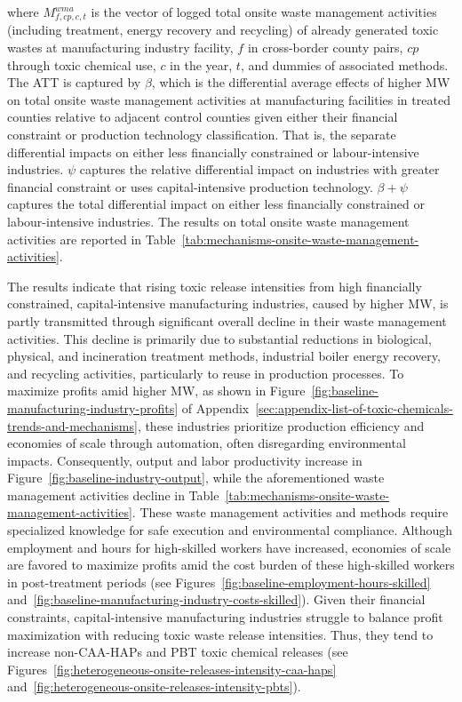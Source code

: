 \documentclass[12pt, english]{article}
\begin{document}
    where $M_{f,cp,c,t}^{wma}$ is the vector of logged total onsite waste management activities (including treatment, energy recovery and recycling) of already generated toxic wastes at manufacturing industry facility, $f$ in cross-border county pairs, $cp$ through toxic chemical use, $c$ in the year, $t$, and dummies of associated methods. The ATT is captured by $\beta$, which is the differential average effects of higher MW on total onsite waste management activities at manufacturing facilities in treated counties relative to adjacent control counties given either their financial constraint or production technology classification. That is, the separate differential impacts on either less financially constrained or labour-intensive industries. $\psi$ captures the relative differential impact on industries with greater financial constraint or uses capital-intensive production technology. $\beta + \psi$ captures the total differential impact on either less financially constrained or labour-intensive industries. The results on total onsite waste management activities are reported in Table~\ref{tab:mechanisms-onsite-waste-management-activities}.
    

    The results indicate that rising toxic release intensities from high financially constrained, capital-intensive manufacturing industries, caused by higher MW, is partly transmitted through significant overall decline in their waste management activities. This decline is primarily due to substantial reductions in biological, physical, and incineration treatment methods, industrial boiler energy recovery, and recycling activities, particularly to reuse in production processes. To maximize profits amid higher MW, as shown in Figure~\ref{fig:baseline-manufacturing-industry-profits} of Appendix~\ref{sec:appendix-list-of-toxic-chemicals-trends-and-mechanisms}, these industries prioritize production efficiency and economies of scale through automation, often disregarding environmental impacts. Consequently, output and labor productivity increase in Figure~\ref{fig:baseline-industry-output}, while the aforementioned waste management activities decline in Table~\ref{tab:mechanisms-onsite-waste-management-activities}. These waste management activities and methods require specialized knowledge for safe execution and environmental compliance. Although employment and hours for high-skilled workers have increased, economies of scale are favored to maximize profits amid the cost burden of these high-skilled workers in post-treatment periods (see Figures~\ref{fig:baseline-employment-hours-skilled} and~\ref{fig:baseline-manufacturing-industry-costs-skilled}). Given their financial constraints, capital-intensive manufacturing industries struggle to balance profit maximization with reducing toxic waste release intensities. Thus, they tend to increase non-CAA-HAPs and PBT toxic chemical releases (see~ Figures~\ref{fig:heterogeneous-onsite-releases-intensity-caa-haps} and~\ref{fig:heterogeneous-onsite-releases-intensity-pbts}).
\end{document}
